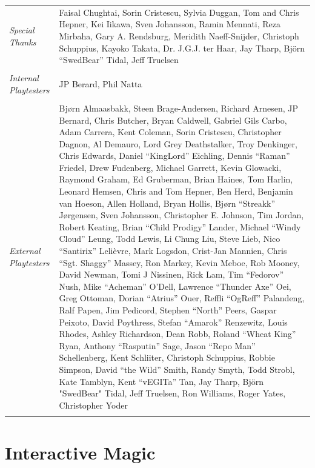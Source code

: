 \begin{tabular}{p{1in} p{3in}}
    \textit{Special Thanks} & Faisal Chughtai, Sorin Cristescu, Sylvia Duggan, Tom and Chris Hepner, Kei Iikawa, Sven Johansson, Ramin Mennati, Reza Mirbaha, Gary A. Rendsburg, Meridith Naeff-Snijder, Christoph Schuppius, Kayoko Takata, Dr. J.G.J. ter Haar, Jay Tharp, Björn “SwedBear” Tidal, Jeff Truelsen \\ \\
    \textit{Internal Playtesters} & JP Berard, Phil Natta \\ \\
    \textit{External Playtesters} & Bjørn Almaasbakk, Steen Brage-Andersen, Richard Arnesen, JP Bernard, Chris Butcher, Bryan Caldwell, Gabriel Gils Carbo, Adam Carrera, Kent Coleman, Sorin Cristescu, Christopher Dagnon, Al Demauro, Lord Grey Deathstalker, Troy Denkinger, Chris Edwards, Daniel “KingLord” Eichling, Dennis “Raman” Friedel, Drew Fudenberg, Michael Garrett, Kevin Glowacki, Raymond Graham, Ed Gruberman, Brian Haines, Tom Harlin, Leonard Hemsen, Chris and Tom Hepner, Ben Herd, Benjamin van Hoeson, Allen Holland, Bryan Hollis, Bjørn “Streakk” Jørgensen, Sven Johansson, Christopher E. Johnson, Tim Jordan, Robert Keating, Brian “Child Prodigy” Lander, Michael “Windy Cloud” Leung, Todd Lewis, Li Chung Liu, Steve Lieb, Nico “Santirix” Lelièvre, Mark Logsdon, Crist-Jan Mannien, Chris “Sgt. Shaggy” Massey, Ron Markey, Kevin Meboe, Rob Mooney, David Newman, Tomi J Nissinen, Rick Lam, Tim “Fedorov” Nush, Mike “Acheman” O'Dell, Lawrence “Thunder Axe” Oei, Greg Ottoman, Dorian “Atrius” Ouer, Reffli “OgReff” Palandeng, Ralf Papen, Jim Pedicord, Stephen “North” Peers, Gaspar Peixoto, David Poythress, Stefan “Amarok” Renzewitz, Louis Rhodes, Ashley Richardson, Dean Robb, Roland “Wheat King” Ryan, Anthony “Rasputin” Sage, Jason “Repo Man” Schellenberg, Kent Schliiter, Christoph Schuppius, Robbie Simpson, David “the Wild” Smith, Randy Smyth, Todd Strobl, Kate Tamblyn, Kent “vEGITa” Tan, Jay Tharp, Björn "SwedBear" Tidal, Jeff Truelsen, Ron Williams, Roger Yates, Christopher Yoder \\ \\
\end{tabular}

\clearpage

\section{Interactive Magic}

